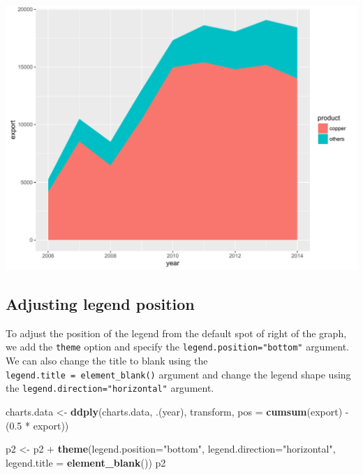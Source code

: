 \documentclass[]{article}
\newenvironment{Shaded}{\begin{snugshade}}{\end{snugshade}}
\newcommand{\KeywordTok}[1]{\textcolor[rgb]{0.13,0.29,0.53}{\textbf{{#1}}}}
\newcommand{\DataTypeTok}[1]{\textcolor[rgb]{0.13,0.29,0.53}{{#1}}}
\newcommand{\FloatTok}[1]{\textcolor[rgb]{0.00,0.00,0.81}{{#1}}}
\newcommand{\StringTok}[1]{\textcolor[rgb]{0.31,0.60,0.02}{{#1}}}
\newcommand{\NormalTok}[1]{{#1}}
\begin{document}
\begin{center}\includegraphics{0_all_posts_pdf/area_1-1} \end{center}

\subsection{Adjusting legend position}\label{adjusting-legend-position}

To adjust the position of the legend from the default spot of right of
the graph, we add the \texttt{theme} option and specify the
\texttt{legend.position="bottom"} argument. We can also change the title
to blank using the \texttt{legend.title\ =\ element\_blank()} argument
and change the legend shape using the
\texttt{legend.direction="horizontal"} argument.

\begin{Shaded}
\begin{Highlighting}[]
\NormalTok{charts.data <-}\StringTok{ }\KeywordTok{ddply}\NormalTok{(charts.data, .(year), transform, }\DataTypeTok{pos =} \KeywordTok{cumsum}\NormalTok{(export) -}\StringTok{ }\NormalTok{(}\FloatTok{0.5} \NormalTok{*}\StringTok{ }\NormalTok{export))}

\NormalTok{p2 <-}\StringTok{ }\NormalTok{p2 +}\StringTok{ }\KeywordTok{theme}\NormalTok{(}\DataTypeTok{legend.position=}\StringTok{"bottom"}\NormalTok{, }\DataTypeTok{legend.direction=}\StringTok{"horizontal"}\NormalTok{, }\DataTypeTok{legend.title =} \KeywordTok{element_blank}\NormalTok{())}
\NormalTok{p2}
\end{Highlighting}
\end{Shaded}
\end{document}

